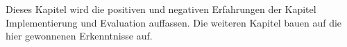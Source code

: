 \begin{tcolorbox}[
	enhanced,
	colback=red!5!white,
	colframe=red!75!black!50,
	title= Mein roter Faden
	]
Dieses Kapitel wird die positiven und negativen Erfahrungen der Kapitel Implementierung und Evaluation auffassen. Die weiteren Kapitel bauen auf die hier gewonnenen Erkenntnisse auf.
\end{tcolorbox}
